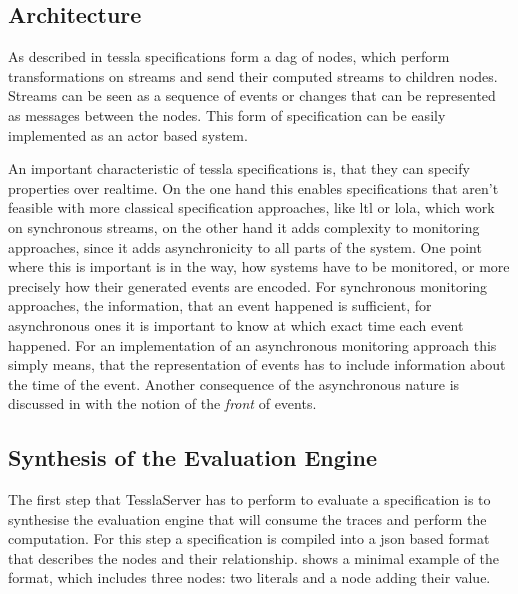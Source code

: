 \subsection{Architecture}
\label{sec:implementation:tesslaserver:architecture}

As described in  \gls{tessla} specifications form a \gls{dag} of nodes, which perform transformations on streams and send their computed streams to children nodes.
Streams can be seen as a sequence of events or changes that can be represented as messages between the nodes.
This form of specification can be easily implemented as an actor based system.

An important characteristic of \gls{tessla} specifications is, that they can specify properties over realtime.
On the one hand this enables specifications that aren't feasible with more classical specification approaches, like \gls{ltl} or \gls{lola}, which work on synchronous streams, on the other hand it adds complexity to monitoring approaches, since it adds asynchronicity to all parts of the system.
One point where this is important is in the way, how systems have to be monitored, or more precisely how their generated events are encoded.
For synchronous monitoring approaches, the information, that an event happened is sufficient, for asynchronous ones it is important to know at which exact time each event happened.
For an implementation of an asynchronous monitoring approach this simply means, that the representation of events has to include information about the time of the event.
Another consequence of the asynchronous nature is discussed in  with the notion of the \emph{front} of events.

\subsection{Synthesis of the Evaluation Engine}

The first step that TesslaServer has to perform to evaluate a specification is to synthesise the evaluation engine that will consume the traces and perform the computation.
For this step a specification is compiled into a \gls{json} based format that describes the nodes and their relationship.
 shows a minimal example of the format, which includes three nodes: two literals and a node adding their value.



